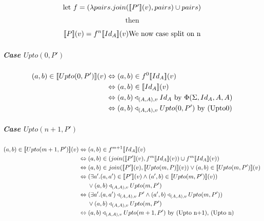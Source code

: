 \documentclass[12pt,a4paper,twoside,openright]{report}
\newcommand{\db}[1]{{\bf [\![}#1{\bf ]\!]}}
\newcommand{\deno}[1]{\db{#1}(v)}
\newcommand{\denoRule}[2]{#1 \in \deno{#2}}
\newcommand{\opRule}[3]{#1 \triangleleft_{#2, v} #3}
\newcommand{\phiRule}[3]{\Phi(\Sigma, #1, #2, #3)}
\begin{document}
\begin{equation}
\label{fDefUpto}
\mbox{let $f = (\lambda pairs. join(\deno{P'}, pairs) \cup pairs)$}\end{equation}
$$\mbox{then}$$

\begin{equation}
\deno{P} = f^n\deno{Id_A}\\
\mbox{We now case split on n}
\end{equation}

\subparagraph{Case $Upto(0, P')$}

\begin{equation}
\begin{split}
\denoRule{(a,b)}{Upto(0, P')} & \Leftrightarrow (a, b) \in f^0 \deno{Id_A} \\
							  & \Leftrightarrow (a, b) \in \deno{Id_A}\\ 
							  & \Leftrightarrow \opRule{(a, b)}{(A, A)}{Id_A} \mbox{    by $\phiRule{Id_A}{A}{A}$}\\ 
							  & \Leftrightarrow \opRule{(a, b)}{(A, A)}{Upto(0, P')} \mbox{    by (Upto0)}\\ 
\end{split}
\end{equation}

\subparagraph{Case $Upto(n+1, P')$}

\begin{equation}
\begin{split}
\denoRule{(a,b)}{Upto(m + 1, P')} & \Leftrightarrow (a, b) \in f^{m+1} \deno{Id_A} \\
							  & \Leftrightarrow (a, b) \in (join(\deno{P'}, f^{m} \deno{Id_A}) \cup f^{m} \deno{Id_A})\\ 
							  & \Leftrightarrow (a, b) \in join(\deno{P'}, \deno{Upto(m, P)}) \vee (a, b) \in \deno{Upto(m, P')}\\ 
							  & \Leftrightarrow (\exists a'.\denoRule{(a, a')}{P'} \wedge \denoRule{(a', b)}{Upto(m, P')}) \\
							  & \indent \vee \opRule{(a, b)}{(A, A)}{Upto(m, P')}\\ 
							  & \Leftrightarrow (\exists a'.\opRule{(a, a')}{(A, A)}{P'} \wedge \opRule{(a', b)}{(A, A)}{Upto(m, P')}) \\
							  & \indent \vee \opRule{(a, b)}{(A, A)}{Upto(m, P')}\\ 
							  & \Leftrightarrow \opRule{(a, b)}{(A, A)}{Upto(m+1, P')}\mbox{   by (Upto n+1), (Upto n)}
\end{split}
\end{equation}
\end{document}
